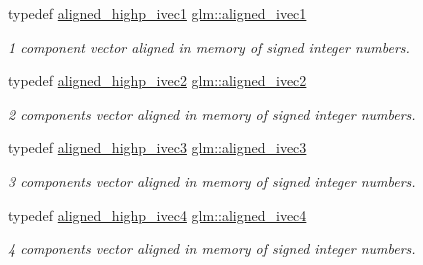 \begin{DoxyCompactItemize}
typedef \hyperlink{group__gtc__type__aligned_ga90ebad7148156f223d4743091c9870d5}{aligned\+\_\+highp\+\_\+ivec1} \hyperlink{group__gtc__type__aligned_gafe9657c41fa58e912f99e92284d79fce}{glm\+::aligned\+\_\+ivec1}
\begin{DoxyCompactList}\small\item\em 1 component vector aligned in memory of signed integer numbers. \end{DoxyCompactList}\item 
\mbox{\label{group__gtc__type__aligned_ga2a709e1d21f3aae3f8d6de910f5fdff4}} 
typedef \hyperlink{group__gtc__type__aligned_ga34105808a80ef5dabd7807997dfef328}{aligned\+\_\+highp\+\_\+ivec2} \hyperlink{group__gtc__type__aligned_ga2a709e1d21f3aae3f8d6de910f5fdff4}{glm\+::aligned\+\_\+ivec2}
\begin{DoxyCompactList}\small\item\em 2 components vector aligned in memory of signed integer numbers. \end{DoxyCompactList}\item 
\mbox{\label{group__gtc__type__aligned_gabbf85e492d39baef3a418c15c996ab65}} 
typedef \hyperlink{group__gtc__type__aligned_gaa469d8bf0cb9ae640c943d847ec48f95}{aligned\+\_\+highp\+\_\+ivec3} \hyperlink{group__gtc__type__aligned_gabbf85e492d39baef3a418c15c996ab65}{glm\+::aligned\+\_\+ivec3}
\begin{DoxyCompactList}\small\item\em 3 components vector aligned in memory of signed integer numbers. \end{DoxyCompactList}\item 
\mbox{\label{group__gtc__type__aligned_gaa33169a30c7d22a8648f20b4534f635f}} 
typedef \hyperlink{group__gtc__type__aligned_gabbac4883efc1760f4efb450753794f2d}{aligned\+\_\+highp\+\_\+ivec4} \hyperlink{group__gtc__type__aligned_gaa33169a30c7d22a8648f20b4534f635f}{glm\+::aligned\+\_\+ivec4}
\begin{DoxyCompactList}\small\item\em 4 components vector aligned in memory of signed integer numbers. \end{DoxyCompactList}\item 
\mbox{\label{group__gtc__type__aligned_gaed29e084c549e66663667ea4127b30a5}} 

\end{DoxyCompactItemize}
